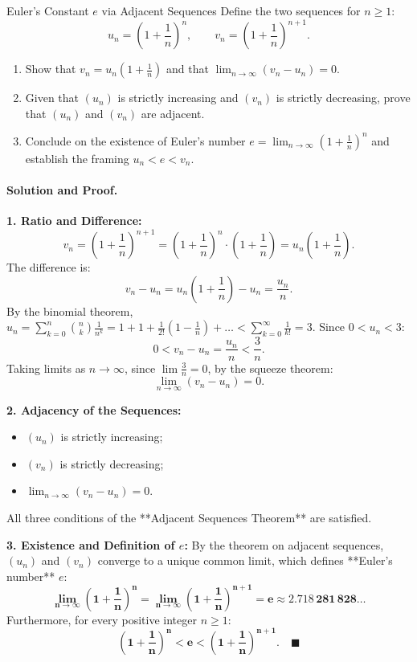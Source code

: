 \begin{workedexample}{Euler's Constant $e$ via Adjacent Sequences}
Define the two sequences for $n \ge 1$:
\[
u_n = \left( 1 + \frac{1}{n} \right)^n, \qquad v_n = \left( 1 + \frac{1}{n} \right)^{n+1}.
\]
\begin{enumerate}[leftmargin=1.4em,itemsep=2pt]
  \item Show that $v_n = u_n \left( 1 + \frac{1}{n} \right)$ and that $\lim_{n \to \infty} (v_n - u_n) = 0$.
  \item Given that $(u_n)$ is strictly increasing and $(v_n)$ is strictly decreasing, prove that $(u_n)$ and $(v_n)$ are adjacent.
  \item Conclude on the existence of Euler's number $e = \lim_{n \to \infty} \left( 1 + \frac{1}{n} \right)^n$ and establish the framing $u_n < e < v_n$.
\end{enumerate}

\paragraph{Solution and Proof.}
\textbf{1. Ratio and Difference:}
\[
v_n = \left( 1 + \frac{1}{n} \right)^{n+1} = \left( 1 + \frac{1}{n} \right)^n \cdot \left( 1 + \frac{1}{n} \right) = u_n \left( 1 + \frac{1}{n} \right).
\]
The difference is:
\[
v_n - u_n = u_n \left( 1 + \frac{1}{n} \right) - u_n = \frac{u_n}{n}.
\]
By the binomial theorem, $u_n = \sum_{k=0}^n \binom{n}{k} \frac{1}{n^k} = 1 + 1 + \frac{1}{2!} \left(1 - \frac{1}{n}\right) + \dots < \sum_{k=0}^\infty \frac{1}{k!} = 3$.
Since $0 < u_n < 3$:
\[
0 < v_n - u_n = \frac{u_n}{n} < \frac{3}{n}.
\]
Taking limits as $n \to \infty$, since $\lim \frac{3}{n} = 0$, by the squeeze theorem:
\[
\lim_{n \to \infty} (v_n - u_n) = 0.
\]

\textbf{2. Adjacency of the Sequences:}
\begin{itemize}[leftmargin=1.4em,itemsep=1pt]
  \item $(u_n)$ is strictly increasing;
  \item $(v_n)$ is strictly decreasing;
  \item $\lim_{n \to \infty} (v_n - u_n) = 0$.
\end{itemize}
All three conditions of the **Adjacent Sequences Theorem** are satisfied.

\textbf{3. Existence and Definition of $e$:}
By the theorem on adjacent sequences, $(u_n)$ and $(v_n)$ converge to a unique common limit, which defines **Euler's number** $e$:
\[
\mathbf{\lim_{n \to \infty} \left( 1 + \frac{1}{n} \right)^n = \lim_{n \to \infty} \left( 1 + \frac{1}{n} \right)^{n+1} = e \approx 2.718\,281\,828\dots}
\]
Furthermore, for every positive integer $n \ge 1$:
\[
\mathbf{\left( 1 + \frac{1}{n} \right)^n < e < \left( 1 + \frac{1}{n} \right)^{n+1}}. \quad \blacksquare
\]
\end{workedexample}
